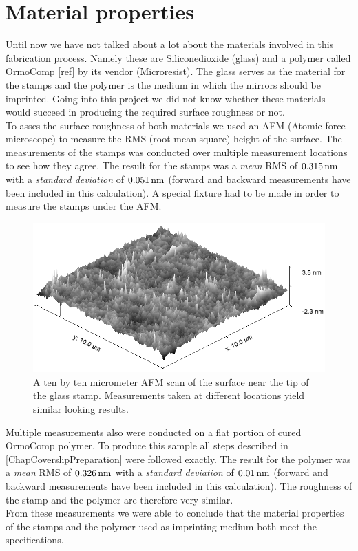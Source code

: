 \section{Material properties}
Until now we have not talked about a lot about the materials involved in this fabrication process. Namely these are Siliconedioxide (glass) and a polymer called OrmoComp [ref] by its vendor (Microresist). The glass serves as the material for the stamps and the polymer is the medium in which the mirrors should be imprinted. Going into this project we did not know whether these materials would succeed in producing the required surface roughness or not.\\
To asses the surface roughness of both materials we used an AFM (Atomic force microscope) to measure the RMS (root-mean-square) height of the surface. The measurements of the stamps was conducted over multiple measurement locations to see how they agree. The result for the stamps was a \textit{mean} RMS of $0.315\,\text{nm}$ with a \textit{standard deviation} of $0.051\,\text{nm}$ (forward and backward measurements have been included in this calculation). A special fixture had to be made in order to measure the stamps under the AFM.\\
\begin{figure}[H]
	\includegraphics[scale=0.5]{source/stamp_rms}
	\caption{A ten by ten micrometer AFM scan of the surface near the tip of the glass stamp. Measurements taken at different locations yield similar looking results.}
\end{figure}
Multiple measurements also were conducted on a flat portion of cured OrmoComp polymer. To produce this sample all steps described in \autoref{ChapCoverslipPreparation} were followed exactly. The result for the polymer was a \textit{mean} RMS of $0.326\,\text{nm}$ with a \textit{standard deviation} of $0.01\,\text{nm}$ (forward and backward measurements have been included in this calculation). The roughness of the stamp and the polymer are therefore very similar.\\
From these measurements we were able to conclude that the material properties of the stamps and the polymer used as imprinting medium both meet the specifications. 

